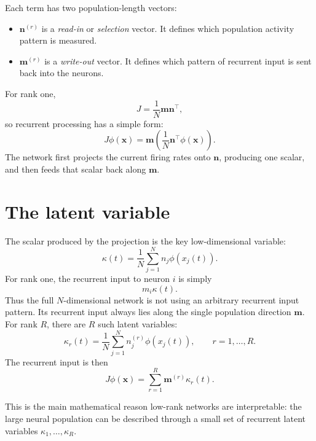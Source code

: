 \documentclass[11pt]{article}
\newcommand{\vx}{\mathbf{x}}
\newcommand{\vm}{\mathbf{m}}
\newcommand{\vn}{\mathbf{n}}
\begin{document}
Each term has two population-length vectors:
\begin{itemize}
  \item $\vn^{(r)}$ is a \emph{read-in} or \emph{selection} vector. It defines
  which population activity pattern is measured.
  \item $\vm^{(r)}$ is a \emph{write-out} vector. It defines which pattern of
  recurrent input is sent back into the neurons.
\end{itemize}

For rank one,
\begin{equation}
  J = \frac{1}{N}\vm\vn^\top,
\end{equation}
so recurrent processing has a simple form:
\begin{equation}
  J\phi(\vx)
  =
  \vm
  \left(
    \frac{1}{N}\vn^\top \phi(\vx)
  \right).
\end{equation}
The network first projects the current firing rates onto $\vn$, producing one
scalar, and then feeds that scalar back along $\vm$.

\section{The latent variable}

The scalar produced by the projection is the key low-dimensional variable:
\begin{equation}
  \kappa(t)
  =
  \frac{1}{N}
  \sum_{j=1}^{N} n_j \phi(x_j(t)).
  \label{eq:kappa_rank_one}
\end{equation}
For rank one, the recurrent input to neuron $i$ is simply
\begin{equation}
  m_i \kappa(t).
\end{equation}
Thus the full $N$-dimensional network is not using an arbitrary recurrent input
pattern. Its recurrent input always lies along the single population direction
$\vm$. For rank $R$, there are $R$ such latent variables:
\begin{equation}
  \kappa_r(t)
  =
  \frac{1}{N}
  \sum_{j=1}^{N} n_j^{(r)} \phi(x_j(t)),
  \qquad r=1,\ldots,R.
\end{equation}
The recurrent input is then
\begin{equation}
  J\phi(\vx)
  =
  \sum_{r=1}^{R} \vm^{(r)}\kappa_r(t).
  \label{eq:recurrent_low_dim}
\end{equation}

This is the main mathematical reason low-rank networks are interpretable: the
large neural population can be described through a small set of recurrent latent
variables $\kappa_1,\ldots,\kappa_R$.
\end{document}
